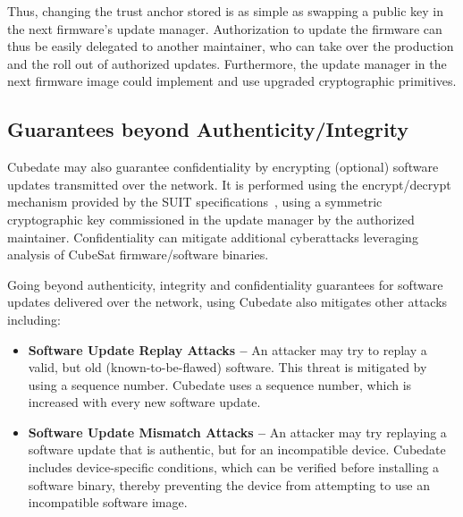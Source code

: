 Thus, changing the trust anchor stored is as simple as swapping a public key in the next firmware's update manager.
Authorization to update the firmware can thus be easily delegated to another maintainer,
who can take over the production and the roll out of authorized updates. Furthermore, the update manager
in the next firmware image could implement and use upgraded cryptographic primitives.

\subsection{Guarantees beyond Authenticity/Integrity}

Cubedate may also guarantee confidentiality by encrypting (optional) software updates transmitted over the network.
It is performed using the encrypt/decrypt mechanism provided by the SUIT specifications~\cite{suit-firmware-encryption},
using a symmetric cryptographic key commissioned in the update manager by the authorized maintainer.
Confidentiality can mitigate additional cyberattacks leveraging analysis of CubeSat firmware/software binaries.

Going beyond authenticity, integrity and confidentiality guarantees for software updates delivered over the network,
using Cubedate also mitigates other attacks including:
\begin{itemize}
\item {\bf Software Update Replay Attacks –} An attacker may try to replay a valid, but old (known-to-be-flawed) software.
This threat is mitigated by using a sequence number. Cubedate uses a sequence number, which is increased with every new software update.

\item {\bf Software Update Mismatch Attacks –} An attacker may try replaying a software update that is authentic,
but for an incompatible device. Cubedate includes device-specific conditions, which can be verified before installing
a software binary, thereby preventing the device from attempting to use an incompatible software image.
\end{itemize}
